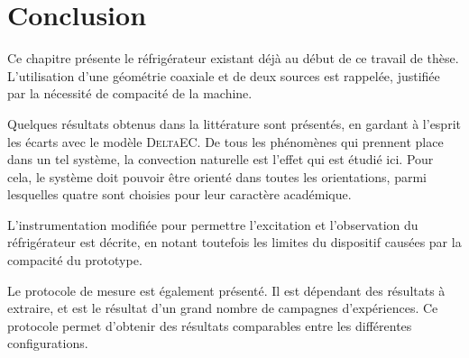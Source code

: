 \section{Conclusion}
Ce chapitre présente le réfrigérateur existant déjà au début de ce travail de thèse. L'utilisation d'une géométrie coaxiale et de deux sources est rappelée, justifiée par la nécessité de compacité de la machine.

Quelques résultats obtenus dans la littérature sont présentés, en gardant à l'esprit les écarts avec le modèle \textsc{DeltaEC}. De tous les phénomènes qui prennent place dans un tel système, la convection naturelle est l'effet qui est étudié ici. Pour cela, le système doit pouvoir être orienté dans toutes les orientations, parmi lesquelles quatre sont choisies pour leur caractère académique.

L'instrumentation modifiée pour permettre l'excitation et l'observation du réfrigérateur est décrite, en notant toutefois les limites du dispositif causées par la compacité du prototype.

Le protocole de mesure est également présenté. Il est dépendant des résultats à extraire, et est le résultat d'un grand nombre de campagnes d'expériences. Ce protocole permet d'obtenir des résultats comparables entre les différentes configurations.




